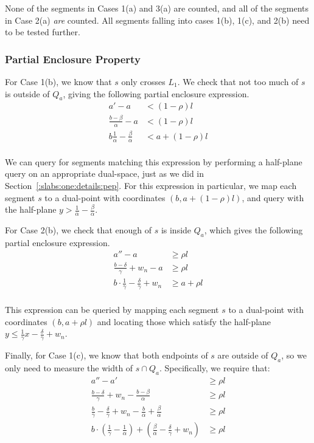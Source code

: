 None of the segments in Cases 1(a) and 3(a) are counted, and all of the segments in Case 2(a) \emph{are} counted. All segments falling into cases 1(b), 1(c), and 2(b) need to be tested further.


\subsubsection{Partial Enclosure Property}

For Case 1(b), we know that $s$ only crosses $L_1$. We check that not too much of $s$ is outside of $Q_a$, giving the following partial enclosure expression.
\[
\begin{split}
a' - a &< (1 - \rho)l \\
%
\frac{b - \beta}{\alpha} - a &< (1 - \rho)l \\
%
b \frac{1}{\alpha} - \frac{\beta}{\alpha} &< a + (1 - \rho)l \\
%
\end{split}
\]

\noindent We can query for segments matching this expression by performing a half-plane query on an appropriate dual-space, just as we did in Section~\ref{:slabs:one:details:pep}. 
For this expression in particular, we map each segment $s$ to a dual-point with coordinates $(b, a + (1-\rho)l)$, and query with the half-plane $y > \frac{1}{\alpha} - \frac{\beta}{\alpha}$.

For Case 2(b), we check that enough of $s$ is inside $Q_a$, which gives the following partial enclosure expression.
\[
\begin{split}
a'' - a &\geq \rho l \\
%
\frac{b - \delta}{\gamma} + w_n - a &\geq \rho l \\
%
b \cdot \frac{1}{\gamma} - \frac{\delta}{\gamma} + w_n &\geq a + \rho l \\
%
\end{split}
\]

\noindent This expression can be queried by mapping each segment $s$ to a dual-point with coordinates $(b, a + \rho l)$ and locating those which satisfy the half-plane $y \leq \frac{1}{\gamma} x - \frac{\delta}{\gamma} + w_n$.

Finally, for Case 1(c), we know that both endpoints of $s$ are outside of $Q_a$, so we only need to measure the width of $s \cap Q_a$.  Specifically, we require that:
\[
\begin{split} 
a'' - a' &\geq \rho l \\
%
\frac{b - \delta}{\gamma} + w_n - \frac{b - \beta}{\alpha} &\geq \rho l \\
%
\frac{b}{\gamma} - \frac{\delta}{\gamma} + w_n - \frac{b}{\alpha} + \frac{\beta}{\alpha} &\geq \rho l \\
%
b \cdot \left ( \frac{1}{\gamma} - \frac{1}{\alpha} \right ) + \left ( \frac{\beta}{\alpha} - \frac{\delta}{\gamma} + w_n \right ) &\geq \rho l \\
%
\end{split}
\]

